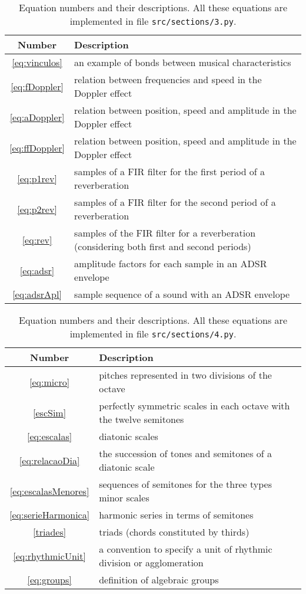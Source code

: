 \documentclass{scrreprt}
\newcommand*{\reff}[1]{%
	{\NoHyper\ref{#1}\endNoHyper}%
	  }
\begin{document}
\begin{table*}[htp!]
\centering
\caption{Equation numbers and their descriptions.
All these equations are implemented in file \texttt{src/sections/3.py}.}
\begin{tabular}{ c | p{12cm} }
   Number & Description \\\hline
 \reff{eq:vinculos} & an example of bonds between musical characteristics \\
 \reff{eq:fDoppler} & relation between frequencies and speed in the Doppler effect \\
 \reff{eq:aDoppler} & relation between position, speed and amplitude in the Doppler effect \\
 \reff{eq:ffDoppler} & relation between position, speed and amplitude in the Doppler effect \\
 \reff{eq:p1rev} & samples of a FIR filter for the first period of a reverberation \\
 \reff{eq:p2rev} & samples of a FIR filter for the second period of a reverberation \\
 \reff{eq:rev} & samples of the FIR filter for a reverberation (considering both first and second periods) \\
 \reff{eq:adsr} & amplitude factors for each sample in an ADSR envelope \\
 \reff{eq:adsrApl} & sample sequence of a sound with an ADSR envelope \\
\end{tabular}
\end{table*}

\begin{table*}[htp!]
\centering
\caption{Equation numbers and their descriptions.
All these equations are implemented in file \texttt{src/sections/4.py}.}
\begin{tabular}{ c | p{12cm} }
   Number & Description \\\hline
 \reff{eq:micro} & pitches represented in two divisions of the octave \\
 \reff{escSim} & perfectly symmetric scales in each octave with the twelve semitones \\
 \reff{eq:escalas} & diatonic scales \\
 \reff{eq:relacaoDia} & the succession of tones and semitones of a diatonic scale \\
 \reff{eq:escalasMenores} & sequences of semitones for the three types minor scales \\
 \reff{eq:serieHarmonica} & harmonic series in terms of semitones \\
 \reff{triades} & triads (chords constituted by thirds) \\
 \reff{eq:rhythmicUnit} & a convention to specify a unit of rhythmic division or agglomeration \\
 \reff{eq:groups} & definition of algebraic groups \\
\end{tabular}
\end{table*}
\end{document}
